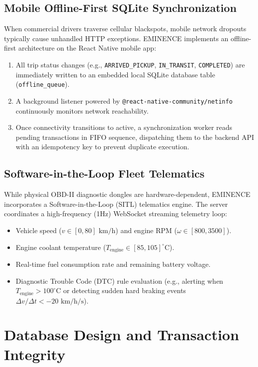 \documentclass[conference]{IEEEtran}
\begin{document}
\subsection{Mobile Offline-First SQLite Synchronization}
When commercial drivers traverse cellular blackspots, mobile network dropouts typically cause unhandled HTTP exceptions. EMINENCE implements an offline-first architecture on the React Native mobile app:
\begin{enumerate}
    \item All trip status changes (e.g., \texttt{ARRIVED\_PICKUP}, \texttt{IN\_TRANSIT}, \texttt{COMPLETED}) are immediately written to an embedded local SQLite database table (\texttt{offline\_queue}).
    \item A background listener powered by \texttt{@react-native-community/netinfo} continuously monitors network reachability.
    \item Once connectivity transitions to active, a synchronization worker reads pending transactions in FIFO sequence, dispatching them to the backend API with an idempotency key to prevent duplicate execution.
\end{enumerate}

\subsection{Software-in-the-Loop Fleet Telematics}
While physical OBD-II diagnostic dongles are hardware-dependent, EMINENCE incorporates a Software-in-the-Loop (SITL) telematics engine. The server coordinates a high-frequency (1Hz) WebSocket streaming telemetry loop:
\begin{itemize}
    \item Vehicle speed ($v \in [0, 80]\text{ km/h}$) and engine RPM ($\omega \in [800, 3500]$).
    \item Engine coolant temperature ($T_{\text{engine}} \in [85, 105]^\circ\text{C}$).
    \item Real-time fuel consumption rate and remaining battery voltage.
    \item Diagnostic Trouble Code (DTC) rule evaluation (e.g., alerting when $T_{\text{engine}} > 100^\circ\text{C}$ or detecting sudden hard braking events $\Delta v / \Delta t < -20\text{ km/h/s}$).
\end{itemize}

\section{Database Design and Transaction Integrity}
\end{document}
